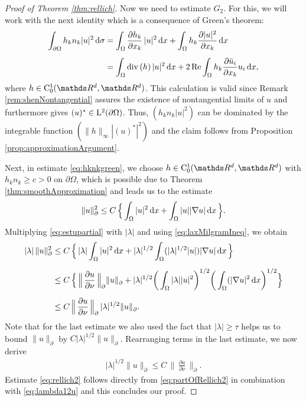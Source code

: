 \begin{proof}[Proof of Theorem \ref{thm:rellich}]
  Now we need to estimate $G_2$.
  For this, we will work with the next identity which is a consequence of Green's theorem:
  \begin{align}
    \int_{\partial\Omega} h_k n_k |u|^2 \, {\operatorname{d}\!{\sigma}}
    &= \int_{\Omega} \frac{\partial h_k}{\partial x_k}\, |u|^2 \, {\operatorname{d}\!{x}} + \int_{\Omega} h_k \frac{\partial |u|^2}{\partial x_k}  \, {\operatorname{d}\!{x}} \nonumber\\[0.5em]
    \label{eq:hknkgreen}
    &= \int_\Omega \mathrm{div\,} (h)\, |u|^2 \, {\operatorname{d}\!{x}} + 2 \operatorname{Re} \int_\Omega h_k \frac{\partial \bar u_i}{\partial x_k} u_i \, {\operatorname{d}\!{x}},
  \end{align}
  where $h \in \CC_0^1(\R^d, \R^d)$.
  This calculation is valid since Remark \ref{rem:shenNontangential} assures the existence of nontangential limits of $u$ and furthermore gives $(u)^* \in \mathrm{L}^2(\partial\Omega)$. Thus, $( h_k n_k |u|^2 )$ can be dominated by the integrable function $(\|h\|_\infty |(u)^*|^2)$ and the claim follows from Proposition \ref{prop:approximationArgument}.

  Next, in estimate \eqref{eq:hknkgreen}, we choose $h \in \CC_0^1(\R^d, \R^d)$ with $h_k n_k \geq c > 0$ on $\partial\Omega$, which is possible due to Theorem \ref{thm:smoothApproximation} and leads us to the estimate 
  \begin{align}
    \label{eq:estupartial}
    \|u\|_\partial^2 \leq C\, \Big\{ \int_\Omega |u|^2 \, {\operatorname{d}\!{x}} +  \int_\Omega |u| |\nabla u| \, {\operatorname{d}\!{x}}\, \Big\}.
  \end{align}
  Multiplying  \eqref{eq:estupartial} with $|\lambda|$ and using \eqref{eq:laxMilgramIneq}, we obtain 
  \begin{align*}
    |\lambda|\, \|u\|_\partial^2 
    &\leq C\, \Big\{\, |\lambda| \int_\Omega |u|^2 \, {\operatorname{d}\!{x}} + |\lambda|^{1/2}  \int_\Omega (|\lambda|^{1/2} |u|) |\nabla u| \, {\operatorname{d}\!{x}}\, \Big\} \nonumber\\[0.5em]
    &\leq C\, \Big\{ \, \Big\|\, \frac{\partial u}{\partial \nu} \, \Big\|^{}_\partial \|u\|^{}_\partial + |\lambda|^{1/2} \bigg( \int_\Omega |\lambda| |u|^2 \bigg)^{1/2} \bigg( \int_\Omega (|\nabla u|^2 \, {\operatorname{d}\!{x}} \bigg)^{1/2} \Big\} \\[0.5em]
    &\leq C\, \Big\|\,\frac{\partial u}{\partial \nu} \, \Big\|^{}_\partial \, |\lambda|^{1/2}  \|u\|^{}_\partial.
  \end{align*}
  Note that for the last estimate we also used the fact that $|\lambda| \geq \tau$ helps us to bound $\|u\|^{}_\partial$ by $C |\lambda|^{1/2} \|u\|^{}_\partial$.
  Rearranging terms in the last estimate, we now derive
  \begin{align}
    \label{eq:lambda12u}
    |\lambda|^{1/2} \|  u\|^{}_\partial \leq C\, \Big\|\, \frac{\partial u}{\partial \nu} \,\Big\|^{}_\partial.
  \end{align}
  Estimate \eqref{eq:rellich2} follows directly from \eqref{eq:partOfRellich2} in combination with \eqref{eq:lambda12u} and this concludes our proof.
\end{proof}

